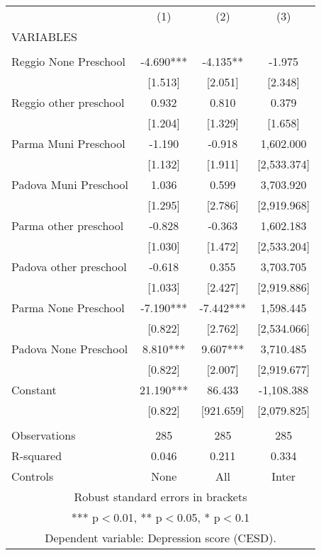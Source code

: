 \begin{tabular}{lccc} \hline
 & (1) & (2) & (3) \\
VARIABLES &  &  &  \\ \hline
 &  &  &  \\
Reggio None Preschool & -4.690*** & -4.135** & -1.975 \\
 & [1.513] & [2.051] & [2.348] \\
Reggio other preschool & 0.932 & 0.810 & 0.379 \\
 & [1.204] & [1.329] & [1.658] \\
Parma Muni Preschool & -1.190 & -0.918 & 1,602.000 \\
 & [1.132] & [1.911] & [2,533.374] \\
Padova Muni Preschool & 1.036 & 0.599 & 3,703.920 \\
 & [1.295] & [2.786] & [2,919.968] \\
Parma other preschool & -0.828 & -0.363 & 1,602.183 \\
 & [1.030] & [1.472] & [2,533.204] \\
Padova other preschool & -0.618 & 0.355 & 3,703.705 \\
 & [1.033] & [2.427] & [2,919.886] \\
Parma None Preschool & -7.190*** & -7.442*** & 1,598.445 \\
 & [0.822] & [2.762] & [2,534.066] \\
Padova None Preschool & 8.810*** & 9.607*** & 3,710.485 \\
 & [0.822] & [2.007] & [2,919.677] \\
Constant & 21.190*** & 86.433 & -1,108.388 \\
 & [0.822] & [921.659] & [2,079.825] \\
 &  &  &  \\
Observations & 285 & 285 & 285 \\
R-squared & 0.046 & 0.211 & 0.334 \\
 Controls & None & All & Inter \\ \hline
\multicolumn{4}{c}{ Robust standard errors in brackets} \\
\multicolumn{4}{c}{ *** p$<$0.01, ** p$<$0.05, * p$<$0.1} \\
\multicolumn{4}{c}{ Dependent variable: Depression score (CESD).} \\
\end{tabular}
